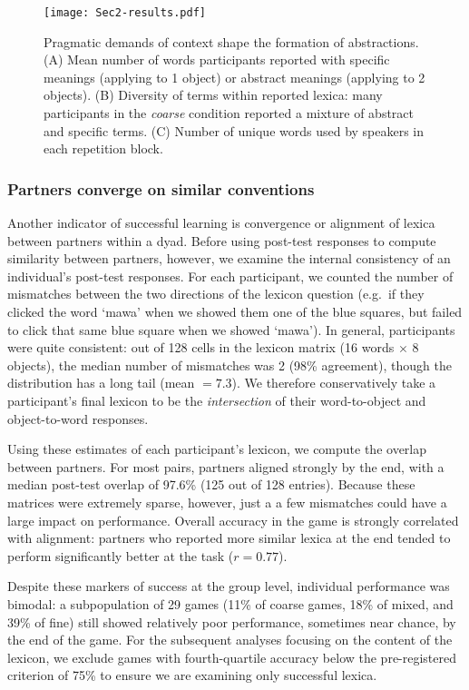 \begin{figure}[t]
\begin{center}
\texttt{[image: Sec2-results.pdf]}
\caption{Pragmatic demands of context shape the formation of abstractions. (A) Mean number of words participants reported with specific meanings (applying to 1 object) or abstract meanings (applying to 2 objects). (B) Diversity of terms within reported lexica: many participants in the \emph{coarse} condition reported a mixture of abstract and specific terms. (C) Number of unique words used by speakers in each repetition block.}
\label{fig:lexiconContent}
\end{center}
\end{figure}


\subsubsection{Partners converge on similar conventions}

Another indicator of successful learning is convergence or alignment of lexica between partners within a dyad. 
Before using post-test responses to compute similarity between partners, however, we examine the internal consistency of an individual's post-test responses. 
For each participant, we counted the number of mismatches between the two directions of the lexicon question (e.g.\ if they clicked the word `mawa' when we showed them one of the blue squares, but failed to click that same blue square when we showed `mawa'). 
In general, participants were quite consistent: out of 128 cells in the lexicon matrix (16 words $\times$ 8 objects), the median number of mismatches was 2 (98\% agreement), though the distribution has a long tail (mean $= 7.3$). 
We therefore conservatively take a participant's final lexicon to be the \emph{intersection} of their word-to-object and object-to-word responses.

Using these estimates of each participant's lexicon, we compute the overlap between partners. 
For most pairs, partners aligned strongly by the end, with a median post-test overlap of 97.6\% (125 out of 128 entries). 
Because these matrices were extremely sparse, however, just a a few mismatches could have a large impact on performance. 
Overall accuracy in the game is strongly correlated with alignment: partners who reported more similar lexica at the end tended to perform significantly better at the task ($r = 0.77$).  

Despite these markers of success at the group level, individual performance was bimodal: a subpopulation of 29 games (11\% of coarse games, 18\% of mixed, and 39\% of fine) still showed relatively poor performance, sometimes near chance, by the end of the game. 
For the subsequent analyses focusing on the content of the lexicon, we exclude games with fourth-quartile accuracy below the pre-registered criterion of 75\% to ensure we are examining only successful lexica. 

